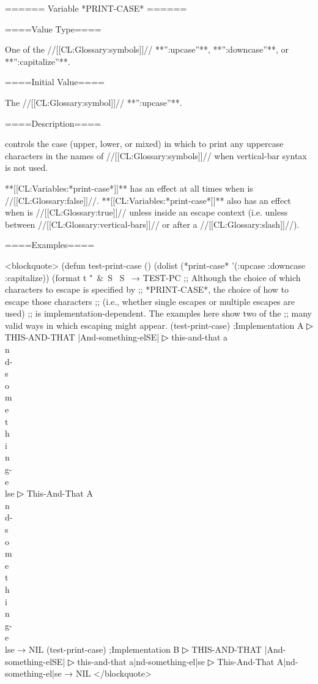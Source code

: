====== Variable *PRINT-CASE* ======

====Value Type====

One of the //[[CL:Glossary:symbols]]// **'':upcase''**, **'':downcase''**, or **'':capitalize''**.

====Initial Value====

The //[[CL:Glossary:symbol]]// **'':upcase''**.

====Description====

 controls the case (upper, lower, or mixed) in which to print any uppercase characters in the names of //[[CL:Glossary:symbols]]// when vertical-bar syntax is not used.

**[[CL:Variables:*print-case*]]** has an effect at all times when  is //[[CL:Glossary:false]]//. **[[CL:Variables:*print-case*]]** also has an effect when  is //[[CL:Glossary:true]]// unless inside an escape context (i.e. unless between //[[CL:Glossary:vertical-bars]]// or after a //[[CL:Glossary:slash]]//).

====Examples====

<blockquote> (defun test-print-case () (dolist (*print-case* '(:upcase :downcase :capitalize)) (format t "~&~S ~S~ → TEST-PC ;; Although the choice of which characters to escape is specified by ;; *PRINT-CASE*, the choice of how to escape those characters ;; (i.e., whether single escapes or multiple escapes are used) ;; is implementation-dependent. The examples here show two of the ;; many valid ways in which escaping might appear. (test-print-case) ;Implementation A
▷ THIS-AND-THAT |And-something-elSE|
▷ this-and-that a\\n\\d-\\s\\o\\m\\e\\t\\h\\i\\n\\g-\\e\\lse
▷ This-And-That A\\n\\d-\\s\\o\\m\\e\\t\\h\\i\\n\\g-\\e\\lse → NIL (test-print-case) ;Implementation B
▷ THIS-AND-THAT |And-something-elSE|
▷ this-and-that a|nd-something-el|se
▷ This-And-That A|nd-something-el|se → NIL </blockquote>


